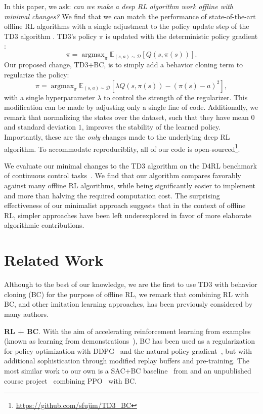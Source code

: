 \documentclass{article}
\newcommand{\E}{\mathbb{E}}
\newcommand{\lb}{\left [}
\newcommand{\rb}{\right ]}
\newcommand{\lp}{\left (}
\newcommand{\rp}{\right )}
\DeclareMathOperator*{\argmax}{argmax}
\begin{document}
In this paper, we ask: 
\textit{can we make a deep RL algorithm work offline with minimal changes?} We find that we can match the performance of state-of-the-art offline RL algorithms with a single adjustment to the policy update step of the TD3 algorithm \citep{fujimoto2018addressing}. TD3's policy $\pi$ is updated with the deterministic policy gradient \citep{DPG}:
\begin{equation}
    \pi = \argmax_\pi \E_{(s,a) \sim \mathcal{D}}[Q(s,\pi(s))].
\end{equation}
Our proposed change, TD3+BC, is to simply add a behavior cloning term to regularize the policy:
\begin{equation} \label{eqn:change1}
    \pi = \argmax_\pi \E_{(s,a) \sim \mathcal{D}} \lb \lambda Q(s,\pi(s)) - \lp \pi(s) - a \rp^2 \rb,
\end{equation}
with a single hyperparameter $\lambda$ to control the strength of the regularizer. This modification can be made by adjusting only a single line of code. Additionally, we remark that normalizing the states over the dataset, such that they have mean $0$ and standard deviation $1$, improves the stability of the learned policy. Importantly, these are the \textit{only} changes made to the underlying deep RL algorithm. To accommodate reproduciblity, all of our code is open-sourced\footnote{\url{https://github.com/sfujim/TD3_BC}}.

We evaluate our minimal changes to the TD3 algorithm on the D4RL benchmark of continuous control tasks~\citep{fu2021benchmarks}. We find that our algorithm compares favorably against many offline RL algorithms, while being significantly easier to implement and more than halving the required computation cost. The surprising effectiveness of our minimalist approach suggests that in the context of offline RL, simpler approaches have been left underexplored in favor of more elaborate algorithmic contributions. 


\section{Related Work}

Although to the best of our knowledge, we are the first to use TD3 with behavior cloning (BC) for the purpose of offline RL, we remark that combining RL with BC, and other imitation learning approaches, has been previously considered by many authors. 

\textbf{RL + BC}. With the aim of accelerating reinforcement learning from examples (known as learning from demonstrations~\citep{atkeson1997robot}), BC has been used as a regularization for policy optimization with DDPG~\citep{DDPG, nair2018overcoming, goecks2020integrating} and the natural policy gradient~\citep{kakade2001natural, rajeswaran2017learning}, but with additional sophistication through modified replay buffers and pre-training. The most similar work to our own is a SAC+BC baseline~\citep{haarnoja2018soft} from \cite{nair2020accelerating} and an unpublished course project~\citep{booherBC} combining PPO~\citep{ppo} with BC.
\end{document}

